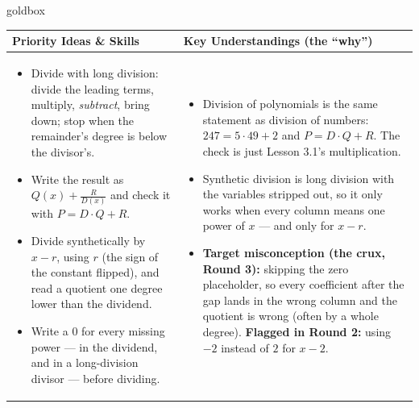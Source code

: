 \documentclass[10pt]{article}
\begin{document}
\renewcommand{\arraystretch}{1.4}
\begin{skillbox}{goldbox}
\begin{tabularx}{\linewidth}{@{}X|X@{}}
\textbf{Priority Ideas \& Skills} & \textbf{Key Understandings (the ``why'')} \\[2pt]
\hline
\vspace{-6pt}
\begin{itemize}[leftmargin=1.1em, nosep, after=\vspace{2pt}]
  \item Divide with long division: divide the leading terms, multiply, \emph{subtract}, bring
        down; stop when the remainder's degree is below the divisor's.
  \item Write the result as $Q(x) + \frac{R}{D(x)}$ and check it with $P = D\cdot Q + R$.
  \item Divide synthetically by $x - r$, using $r$ (the sign of the constant flipped), and read
        a quotient one degree lower than the dividend.
  \item Write a $0$ for every missing power --- in the dividend, and in a long-division divisor
        --- before dividing.
\end{itemize}
&
\vspace{-6pt}
\begin{itemize}[leftmargin=1.1em, nosep, after=\vspace{2pt}]
  \item Division of polynomials is the same statement as division of numbers:
        $247 = 5\cdot49 + 2$ and $P = D\cdot Q + R$. The check is just Lesson 3.1's
        multiplication.
  \item Synthetic division is long division with the variables stripped out, so it only works
        when every column means one power of $x$ --- and only for $x - r$.
  \item \textbf{Target misconception (the crux, Round 3):} skipping the zero placeholder, so
        every coefficient after the gap lands in the wrong column and the quotient is wrong
        (often by a whole degree). \textbf{Flagged in Round 2:} using $-2$ instead of $2$ for
        $x - 2$.
\end{itemize}
\end{tabularx}
\end{skillbox}
\end{document}
